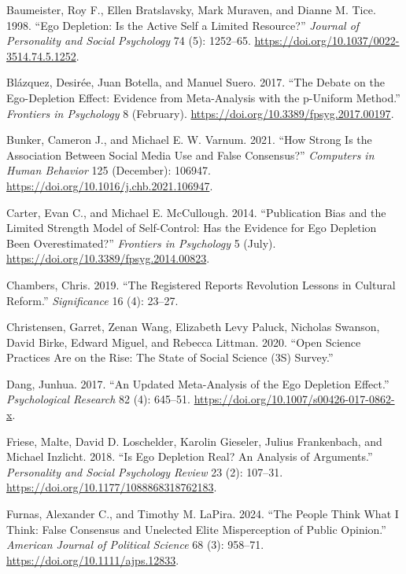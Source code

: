 \documentclass[
  letterpaper,
]{book}
\newlength{\cslhangindent}
\newenvironment{CSLReferences}[2] %
 {\begin{list}{}{%
  \setlength{\itemindent}{0pt}
  \setlength{\leftmargin}{0pt}
  \setlength{\parsep}{0pt}
  \ifodd #1
   \setlength{\leftmargin}{\cslhangindent}
   \setlength{\itemindent}{-1\cslhangindent}
  \fi
  \setlength{\itemsep}{#2\baselineskip}}}
 {\end{list}}
\begin{document}
\label{refs}
\begin{CSLReferences}{1}{0}
Baumeister, Roy F., Ellen Bratslavsky, Mark Muraven, and Dianne M. Tice.
1998. {``Ego Depletion: Is the Active Self a Limited Resource?''}
\emph{Journal of Personality and Social Psychology} 74 (5): 1252--65.
\url{https://doi.org/10.1037/0022-3514.74.5.1252}.

Blázquez, Desirée, Juan Botella, and Manuel Suero. 2017. {``The Debate
on the Ego-Depletion Effect: Evidence from Meta-Analysis with the
p-Uniform Method.''} \emph{Frontiers in Psychology} 8 (February).
\url{https://doi.org/10.3389/fpsyg.2017.00197}.

Bunker, Cameron J., and Michael E. W. Varnum. 2021. {``How Strong Is the
Association Between Social Media Use and False Consensus?''}
\emph{Computers in Human Behavior} 125 (December): 106947.
\url{https://doi.org/10.1016/j.chb.2021.106947}.

Carter, Evan C., and Michael E. McCullough. 2014. {``Publication Bias
and the Limited Strength Model of Self-Control: Has the Evidence for Ego
Depletion Been Overestimated?''} \emph{Frontiers in Psychology} 5
(July). \url{https://doi.org/10.3389/fpsyg.2014.00823}.

Chambers, Chris. 2019. {``The Registered Reports Revolution Lessons in
Cultural Reform.''} \emph{Significance} 16 (4): 23--27.

Christensen, Garret, Zenan Wang, Elizabeth Levy Paluck, Nicholas
Swanson, David Birke, Edward Miguel, and Rebecca Littman. 2020. {``Open
Science Practices Are on the Rise: The State of Social Science (3S)
Survey.''}

Dang, Junhua. 2017. {``An Updated Meta-Analysis of the Ego Depletion
Effect.''} \emph{Psychological Research} 82 (4): 645--51.
\url{https://doi.org/10.1007/s00426-017-0862-x}.

Friese, Malte, David D. Loschelder, Karolin Gieseler, Julius
Frankenbach, and Michael Inzlicht. 2018. {``Is Ego Depletion Real? An
Analysis of Arguments.''} \emph{Personality and Social Psychology
Review} 23 (2): 107--31. \url{https://doi.org/10.1177/1088868318762183}.

Furnas, Alexander C., and Timothy M. LaPira. 2024. {``The People Think
What {I} Think: {False} Consensus and Unelected Elite Misperception of
Public Opinion.''} \emph{American Journal of Political Science} 68 (3):
958--71. \url{https://doi.org/10.1111/ajps.12833}.


\end{CSLReferences}
\end{document}
